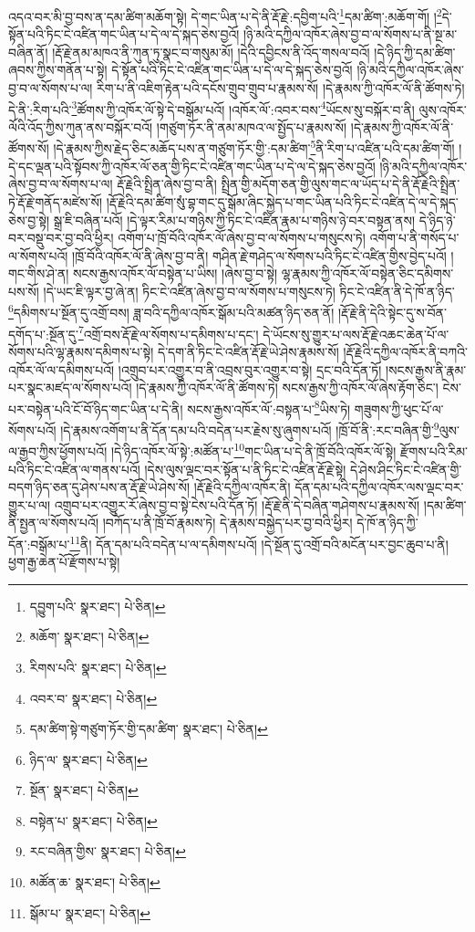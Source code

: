 འདའ་བར་མི་བྱ་བས་ན་དམ་ཚིག་མཆོག་སྟེ། དེ་གང་ཡིན་པ་དེ་ནི་རྡོ་རྗེ་:དབྱིག་པའི་\footnote{དབྱུག་པའི་  སྣར་ཐང་།  པེ་ཅིན། }དམ་ཚིག་:མཆོག་གོ། །\footnote{མཆོག་  སྣར་ཐང་།  པེ་ཅིན། }དེ་སྟོན་པའི་ཏིང་ངེ་འཛིན་གང་ཡིན་པ་དེ་ལ་དེ་སྐད་ཅེས་བྱའོ། །ཉི་མའི་དཀྱིལ་འཁོར་ཞེས་བྱ་བ་ལ་སོགས་པ་ནི་སྔ་མ་བཞིན་ནོ། །རྡོ་རྗེ་ནམ་མཁའ་ནི་ཀུན་ཏུ་སྣང་བ་གསུམ་མོ། །དེའི་དབྱིངས་ནི་འོད་གསལ་བའོ། །དེ་ཉིད་ཀྱི་དམ་ཚིག་ཞབས་ཀྱིས་གནོན་པ་སྟེ། དེ་སྟོན་པའི་ཏིང་ངེ་འཛིན་གང་ཡིན་པ་དེ་ལ་དེ་སྐད་ཅེས་བྱའོ། །ཉི་མའི་དཀྱིལ་འཁོར་ཞེས་བྱ་བ་ལ་སོགས་པ་ལ། རིག་པ་ནི་འཇིག་རྟེན་པའི་དངོས་གྲུབ་གྲུབ་པ་རྣམས་སོ། །དེ་རྣམས་ཀྱི་འཁོར་ལོ་ནི་ཚོགས་ཏེ། དེ་ནི་:རིག་པའི་\footnote{རིགས་པའི་  སྣར་ཐང་།  པེ་ཅིན། }ཚོགས་ཀྱི་འཁོར་ལོ་སྟེ་དེ་བསྒོམ་པའོ། །འཁོར་ལོ་:འབར་བས་\footnote{འབར་བ་  སྣར་ཐང་།  པེ་ཅིན། }ཡོངས་སུ་བསྐོར་བ་ནི། ལུས་འཁོར་ལོའི་འོད་ཀྱིས་ཀུན་ནས་བསྐོར་བའོ། །གཙུག་ཏོར་ནི་ནམ་མཁའ་ལ་སྤྱོད་པ་རྣམས་སོ། །དེ་རྣམས་ཀྱི་འཁོར་ལོ་ནི་ཚོགས་སོ། །དེ་རྣམས་ཀྱིས་རྗེད་ཅིང་མཆོད་པས་ན་གཙུག་ཏོར་གྱི་:དམ་ཚིག་\footnote{དམ་ཚིག་སྟེ་གཙུག་ཏོར་གྱི་དམ་ཚིག་  སྣར་ཐང་།  པེ་ཅིན། }ནི་རིག་པ་འཛིན་པའི་དམ་ཚིག་གོ། །དེ་དང་ལྡན་པའི་སྟོབས་ཀྱི་འཁོར་ལོ་ཅན་གྱི་ཏིང་ངེ་འཛིན་གང་ཡིན་པ་དེ་ལ་དེ་སྐད་ཅེས་བྱའོ། །ཉི་མའི་དཀྱིལ་འཁོར་ཞེས་བྱ་བ་ལ་སོགས་པ་ལ། རྡོ་རྗེའི་སྤྲིན་ཞེས་བྱ་བ་ནི། སྤྲིན་གྱི་མདོག་ཅན་གྱི་ལུས་གང་ལ་ཡོད་པ་དེ་ནི་རྡོ་རྗེའི་སྤྲིན་ཏེ་རྡོ་རྗེ་གནོད་མཛེས་སོ། །རྡོ་རྗེའི་དམ་ཚིག་སུཾ་བྷ་གང་དུ་སྒོམ་ཞིང་སྐྱེད་པ་གང་ཡིན་པའི་ཏིང་ངེ་འཛིན་དེ་ལ་དེ་སྐད་ཅེས་བྱ་སྟེ། སྒྲ་ཇི་བཞིན་པའོ། །དེ་ལྟར་རིམ་པ་གཉིས་ཀྱི་ཏིང་ངེ་འཛིན་རྣམ་པ་གཉིས་ཉེ་བར་བསྟན་ནས། དེ་ཉིད་ཉེ་བར་བསྡུ་བར་བྱ་བའི་ཕྱིར། འགོག་པ་ཁྲོ་བོའི་འཁོར་ལོ་ཞེས་བྱ་བ་ལ་སོགས་པ་གསུངས་ཏེ། འགོག་པ་ནི་གསོད་པ་ལ་སོགས་པའོ། །ཁྲོ་བོའི་འཁོར་ལོ་ནི་ཞེས་བྱ་བ་ནི། གཤིན་རྗེ་གཤེད་ལ་སོགས་པའི་ཏིང་ངེ་འཛིན་གྱིས་བྱེད་པའོ། །གང་གིས་ཤེ་ན། སངས་རྒྱས་འཁོར་ལོ་བསྟེན་པ་ཡིས། །ཞེས་བྱ་བ་སྟེ། ལྷ་རྣམས་ཀྱི་འཁོར་ལོ་བསྟེན་ཅིང་དམིགས་པས་སོ། །དེ་ཡང་ཇི་ལྟར་བྱ་ཞེ་ན། ཏིང་ངེ་འཛིན་ཞེས་བྱ་བ་ལ་སོགས་པ་གསུངས་ཏེ། ཏིང་ངེ་འཛིན་ནི་དེ་ཁོ་ན་ཉིད་\footnote{ཉིད་ལ་  སྣར་ཐང་།  པེ་ཅིན། }དམིགས་པ་སྔོན་དུ་འགྲོ་བས། ཟླ་བའི་དཀྱིལ་འཁོར་སྒོམ་པའི་མཚན་ཉིད་ཅན་ནོ། །རྡོ་རྗེ་ནི་དེའི་སྟེང་དུ་ས་བོན་དགོད་པ་:སྔོན་དུ་\footnote{སྔོན་  སྣར་ཐང་།  པེ་ཅིན། }འགྲོ་བས་རྡོ་རྗེ་ལ་སོགས་པ་དམིགས་པ་དང་། དེ་ཡོངས་སུ་གྱུར་པ་ལས་རྡོ་རྗེ་འཆང་ཆེན་པོ་ལ་སོགས་པའི་ལྷ་རྣམས་དམིགས་པ་སྟེ། དེ་དག་ནི་ཏིང་ངེ་འཛིན་རྡོ་རྗེ་ཡེ་ཤེས་རྣམས་སོ། །རྡོ་རྗེའི་དཀྱིལ་འཁོར་ནི་བཀའི་འཁོར་ལོ་ལ་དམིགས་པའོ། །འགྲུབ་པར་འགྱུར་བ་ནི་འབྲས་བུར་འགྱུར་བ་སྟེ། དྲང་བའི་དོན་ཏོ། །སངས་རྒྱས་ནི་རྣམ་པར་སྣང་མཛད་ལ་སོགས་པའོ། །དེ་རྣམས་ཀྱི་འཁོར་ལོ་ནི་ཚོགས་ཏེ། སངས་རྒྱས་ཀྱི་འཁོར་ལོ་ཞེས་རྟོག་ཅིང་། ངེས་པར་བསྟེན་པའི་ངོ་བོ་ཉིད་གང་ཡིན་པ་དེ་ནི། སངས་རྒྱས་འཁོར་ལོ་:བསྟན་པ་\footnote{བསྟེན་པ་  སྣར་ཐང་།  པེ་ཅིན། }ཡིས་ཏེ། གཟུགས་ཀྱི་ཕུང་པོ་ལ་སོགས་པའོ། །དེ་རྣམས་འགོག་པ་ནི་དོན་དམ་པའི་བདེན་པར་རྗེས་སུ་ཞུགས་པའོ། །ཁྲོ་བོ་ནི་:རང་བཞིན་གྱི་\footnote{རང་བཞིན་གྱིས་  སྣར་ཐང་།  པེ་ཅིན། }ལུས་ལ་རྒྱབ་ཀྱིས་ཕྱོགས་པའོ། །དེ་ཉིད་འཁོར་ལོ་སྟེ་:མཚོན་པ་\footnote{མཚོན་ཆ་  སྣར་ཐང་།  པེ་ཅིན། }གང་ཡིན་པ་དེ་ནི་ཁྲོ་བོའི་འཁོར་ལོ་སྟེ། རྫོགས་པའི་རིམ་པའི་ཏིང་ངེ་འཛིན་ལ་གནས་པའོ། །དེས་ལུས་ལྡང་བར་སྟོན་པ་ནི་ཏིང་ངེ་འཛིན་རྡོ་རྗེ་སྟེ། དེ་ཤེས་ཤིང་ཏིང་ངེ་འཛིན་གྱི་བདག་ཉིད་ཅན་དུ་ཤེས་པས་ན་རྡོ་རྗེ་ཡེ་ཤེས་སོ། །རྡོ་རྗེའི་དཀྱིལ་འཁོར་ནི། དོན་དམ་པའི་དཀྱིལ་འཁོར་ལས་ལྡང་བར་གྱུར་པ་ལ། འགྲུབ་པར་འགྱུར་རོ་ཞེས་བྱ་བ་སྟེ་ངེས་པའི་དོན་ཏོ། །རྡོ་རྗེ་ནི་དེ་བཞིན་གཤེགས་པ་རྣམས་སོ། །དམ་ཚིག་ནི་སྤྱན་ལ་སོགས་པའོ། །བཀོད་པ་ནི་ཁྲོ་བོ་རྣམས་ཏེ། དེ་རྣམས་བསྐྱེད་པར་བྱ་བའི་ཕྱིར། དེ་ཁོ་ན་ཉིད་ཀྱི་དོན་:བསྒོམ་པ་\footnote{སྒོམ་པ་  སྣར་ཐང་།  པེ་ཅིན། }ནི། དོན་དམ་པའི་བདེན་པ་ལ་དམིགས་པའོ། །དེ་སྔོན་དུ་འགྲོ་བའི་མངོན་པར་བྱང་ཆུབ་པ་ནི། ཕྱག་རྒྱ་ཆེན་པོ་རྫོགས་པ་སྟེ། 